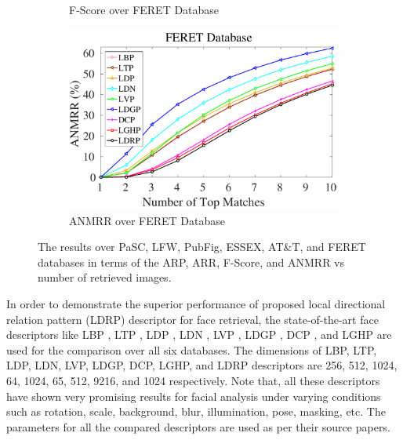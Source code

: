 \documentclass[a4paper]{article}
\begin{document}
\begin{figure}[!t]
\begin{subfigure}{.25\textwidth}
    \caption{F-Score over FERET Database}
    \label{fig:feret-f}
  \end{subfigure}%
    \begin{subfigure}{.25\textwidth}
    \centering
    \includegraphics[width=.98\linewidth]{feret-anmrr}
    \caption{ANMRR over FERET Database}
    \label{fig:feret-anmrr}
  \end{subfigure}
  \vspace{2mm}
  
  \caption{The results over PaSC, LFW, PubFig, ESSEX, AT\&T, and FERET databases in terms of the ARP, ARR, F-Score, and ANMRR vs number of retrieved images.}
  \label{fig:results}
\end{figure}



In order to demonstrate the superior performance of proposed local directional relation pattern (LDRP) descriptor for face retrieval, the state-of-the-art face descriptors like LBP \cite{lbp}, LTP
\cite{ltp}, LDP \cite{ldp}, LDN \cite{ldn}, LVP \cite{lvp}, LDGP \cite{ldgp}, DCP \cite{dcp}, and LGHP \cite{lghp} are used for the comparison over all six databases. The dimensions of LBP, LTP, LDP, LDN, LVP, LDGP, DCP, LGHP, and LDRP descriptors are 256, 512, 1024, 64, 1024, 65, 512, 9216, and 1024 respectively. Note that, all these descriptors have shown very promising results for facial analysis under varying conditions such as rotation, scale, background, blur, illumination, pose, masking, etc. The parameters for all the compared descriptors are  used as per their source papers.
\end{document}

